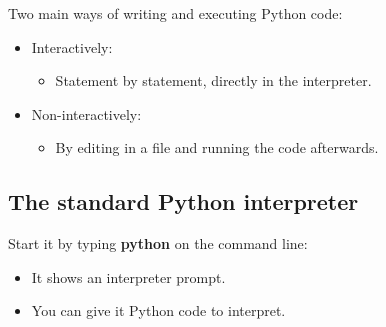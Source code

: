 \documentclass[aspectratio=1610,slidestop]{beamer}
\begin{document}
\begin{pframe}
  Two main ways of writing and executing Python code:
  \begin{itemize}
    \item Interactively:
    \begin{itemize}
     \item Statement by statement, directly in the interpreter.
    \end{itemize}
    \item Non-interactively:
    \begin{itemize}
     \item By editing in a file and running the code afterwards.
    \end{itemize}
  \end{itemize}
\end{pframe}

\subsection{The standard Python interpreter}
\begin{pframe}
  Start it by typing \textbf{python} on the command line:
  \begin{terminal}
  \color{white}{
  \begin{lstlisting}[frame=,style=,numbers=none]
$ python
Python 3.7 (default, Nov 12 2018, 13:43:14)
[GCC 5.4.0 20160609] on linux
Type "help", "copyright", "credits" or "license" for more information.
>>>
  \end{lstlisting}}
 \end{terminal}
 \begin{itemize}
  \item It shows an interpreter prompt.
  \item You can give it Python code to interpret.
 \end{itemize}
\end{pframe}
\end{document}
